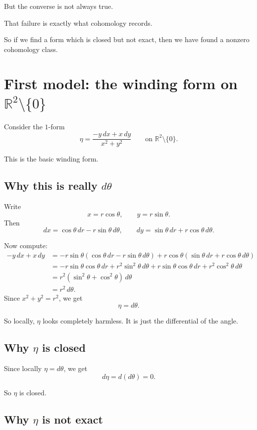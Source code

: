 \documentclass[11pt]{article}
\begin{document}
	But the converse is not always true.
	
	That failure is exactly what cohomology records.
	
	So if we find a form which is closed but not exact, then we have found a nonzero cohomology class.
	
	\section{First model: the winding form on \(\mathbb{R}^2\setminus\{0\}\)}
	
	Consider the \(1\)-form
	\[
	\eta=\frac{-y\,dx+x\,dy}{x^2+y^2}
	\qquad\text{on }\mathbb{R}^2\setminus\{0\}.
	\]
	
	This is the basic winding form.
	
	\subsection{Why this is really \(d\theta\)}
	
	Write
	\[
	x=r\cos\theta,\qquad y=r\sin\theta.
	\]
	Then
	\[
	dx=\cos\theta\,dr-r\sin\theta\,d\theta,
	\qquad
	dy=\sin\theta\,dr+r\cos\theta\,d\theta.
	\]
	
	Now compute:
	\begin{align*}
		-y\,dx+x\,dy
		&=
		-r\sin\theta(\cos\theta\,dr-r\sin\theta\,d\theta)
		+r\cos\theta(\sin\theta\,dr+r\cos\theta\,d\theta)\\
		&=
		-r\sin\theta\cos\theta\,dr+r^2\sin^2\theta\,d\theta
		+r\sin\theta\cos\theta\,dr+r^2\cos^2\theta\,d\theta\\
		&=
		r^2(\sin^2\theta+\cos^2\theta)\,d\theta\\
		&=
		r^2\,d\theta.
	\end{align*}
	Since \(x^2+y^2=r^2\), we get
	\[
	\eta=d\theta.
	\]
	
	So locally, \(\eta\) looks completely harmless. It is just the differential of the angle.
	
	\subsection{Why \(\eta\) is closed}
	
	Since locally \(\eta=d\theta\), we get
	\[
	d\eta=d(d\theta)=0.
	\]
	
	So \(\eta\) is closed.
	
	\subsection{Why \(\eta\) is not exact}
	
\end{document}
